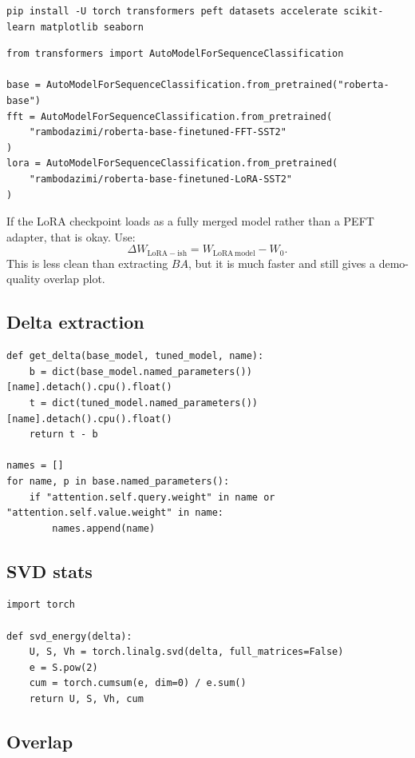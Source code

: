 \documentclass[11pt]{article}
\begin{document}
\begin{verbatim}
pip install -U torch transformers peft datasets accelerate scikit-learn matplotlib seaborn
\end{verbatim}

\begin{verbatim}
from transformers import AutoModelForSequenceClassification

base = AutoModelForSequenceClassification.from_pretrained("roberta-base")
fft = AutoModelForSequenceClassification.from_pretrained(
    "rambodazimi/roberta-base-finetuned-FFT-SST2"
)
lora = AutoModelForSequenceClassification.from_pretrained(
    "rambodazimi/roberta-base-finetuned-LoRA-SST2"
)
\end{verbatim}

If the LoRA checkpoint loads as a fully merged model rather than a PEFT adapter, that is okay. Use:
\[
\Delta W_{\mathrm{LoRA-ish}} = W_{\mathrm{LoRA\,model}} - W_0.
\]
This is less clean than extracting $BA$, but it is much faster and still gives a demo-quality overlap plot.

\subsection{Delta extraction}

\begin{verbatim}
def get_delta(base_model, tuned_model, name):
    b = dict(base_model.named_parameters())[name].detach().cpu().float()
    t = dict(tuned_model.named_parameters())[name].detach().cpu().float()
    return t - b

names = []
for name, p in base.named_parameters():
    if "attention.self.query.weight" in name or "attention.self.value.weight" in name:
        names.append(name)
\end{verbatim}

\subsection{SVD stats}

\begin{verbatim}
import torch

def svd_energy(delta):
    U, S, Vh = torch.linalg.svd(delta, full_matrices=False)
    e = S.pow(2)
    cum = torch.cumsum(e, dim=0) / e.sum()
    return U, S, Vh, cum
\end{verbatim}

\subsection{Overlap}
\end{document}

